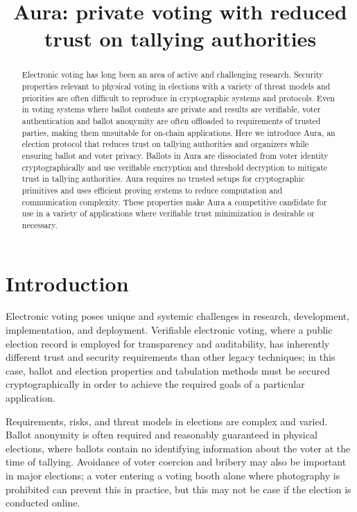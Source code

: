 \documentclass{llncs}
\begin{document}
\title{Aura: private voting with reduced trust on tallying authorities}
\author{}
\institute{}
\maketitle

\begin{abstract}
	Electronic voting has long been an area of active and challenging research.
	Security properties relevant to physical voting in elections with a variety of threat models and priorities are often difficult to reproduce in cryptographic systems and protocols.
    Even in voting systems where ballot contents are private and results are verifiable, voter authentication and ballot anonymity are often offloaded to requirements of trusted parties, making them unsuitable for on-chain applications.
	Here we introduce Aura, an election protocol that reduces trust on tallying authorities and organizers while ensuring ballot and voter privacy.
	Ballots in Aura are dissociated from voter identity cryptographically and use verifiable encryption and threshold decryption to mitigate trust in tallying authorities.
    Aura requires no trusted setups for cryptographic primitives and uses efficient proving systems to reduce computation and communication complexity.
	These properties make Aura a competitive candidate for use in a variety of applications where verifiable trust minimization is desirable or necessary.
\end{abstract}


\section{Introduction}

Electronic voting poses unique and systemic challenges in research, development, implementation, and deployment.
Verifiable electronic voting, where a public election record is employed for transparency and auditability, has inherently different trust and security requirements than other legacy techniques; in this case, ballot and election properties and tabulation methods must be secured cryptographically in order to achieve the required goals of a particular application.

Requirements, risks, and threat models in elections are complex and varied.
Ballot anonymity is often required and reasonably guaranteed in physical elections, where ballots contain no identifying information about the voter at the time of tallying.
Avoidance of voter coercion and bribery may also be important in major elections; a voter entering a voting booth alone where photography is prohibited can prevent this in practice, but this may not be case if the election is conducted online.
\end{document}

